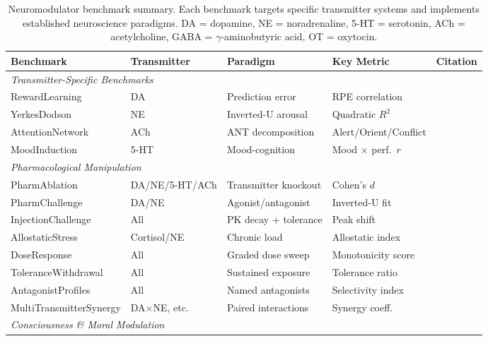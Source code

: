 \documentclass[11pt,letterpaper]{article}
\begin{document}
\begin{table}[t]
\centering
\caption{Neuromodulator benchmark summary. Each benchmark targets specific transmitter systems and implements established neuroscience paradigms. DA = dopamine, NE = noradrenaline, 5-HT = serotonin, ACh = acetylcholine, GABA = $\gamma$-aminobutyric acid, OT = oxytocin.}
\label{tab:neuromod}
\scriptsize
\begin{tabular}{@{}p{2.4cm}p{2.0cm}p{2.2cm}p{2.2cm}p{2.8cm}@{}}
\toprule
\textbf{Benchmark} & \textbf{Transmitter} & \textbf{Paradigm} & \textbf{Key Metric} & \textbf{Citation} \\
\midrule
\multicolumn{5}{l}{\emph{Transmitter-Specific Benchmarks}} \\
RewardLearning & DA & Prediction error & RPE correlation & \citet{schultz1997dopamine} \\
YerkesDodson & NE & Inverted-U arousal & Quadratic $R^2$ & \citet{yerkes1908relation} \\
AttentionNetwork & ACh & ANT decomposition & Alert/Orient/Conflict & \citet{posner1990attention} \\
MoodInduction & 5-HT & Mood-cognition & Mood $\times$ perf.\ $r$ & \citet{dayan2009serotonin} \\
\midrule
\multicolumn{5}{l}{\emph{Pharmacological Manipulation}} \\
PharmAblation & DA/NE/5-HT/ACh & Transmitter knockout & Cohen's $d$ & \citet{doya2002metalearning} \\
PharmChallenge & DA/NE & Agonist/antagonist & Inverted-U fit & \citet{arnsten2011catecholamine} \\
InjectionChallenge & All & PK decay + tolerance & Peak shift & \citet{arnsten2011catecholamine} \\
AllostaticStress & Cortisol/NE & Chronic load & Allostatic index & \citet{mcewen1998stress} \\
DoseResponse & All & Graded dose sweep & Monotonicity score & \citet{clark1937log} \\
ToleranceWithdrawal & All & Sustained exposure & Tolerance ratio & \citet{koob2001drug} \\
AntagonistProfiles & All & Named antagonists & Selectivity index & \citet{stahl2013essential} \\
MultiTransmitter\-Synergy & DA$\times$NE, etc. & Paired interactions & Synergy coeff. & \citet{doya2002metalearning} \\
\midrule
\multicolumn{5}{l}{\emph{Consciousness \& Moral Modulation}} \\

\end{tabular}
\end{table}
\end{document}
